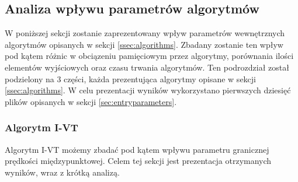 \subsection{Analiza wpływu parametrów algorytmów}
\label{ssec:queryparameters}
W poniższej sekcji zostanie zaprezentowany wpływ parametrów wewnętrznych algorytmów opisanych w sekcji \ref{ssec:algorithms}. Zbadany zostanie ten wpływ pod kątem różnic w obciązeniu pamięciowym przez algorytmy, porównania ilości elementów wyjściowych oraz czasu trwania algorytmów. Ten podrozdział został podzielony na 3 części, każda prezentująca algorytmy opisane w sekcji \ref{ssec:algorithms}. W celu prezentacji wyników wykorzystano pierwszych dziesięć plików opisanych w sekcji \ref{sec:entryparameters}.
\subsubsection{Algorytm I-VT}
\label{sssec:ivtresults}
Algorytm I-VT możemy zbadać pod kątem wpływu parametru granicznej prędkości międzypunktowej. Celem tej sekcji jest prezentacja otrzymanych wyników, wraz z krótką analizą.
